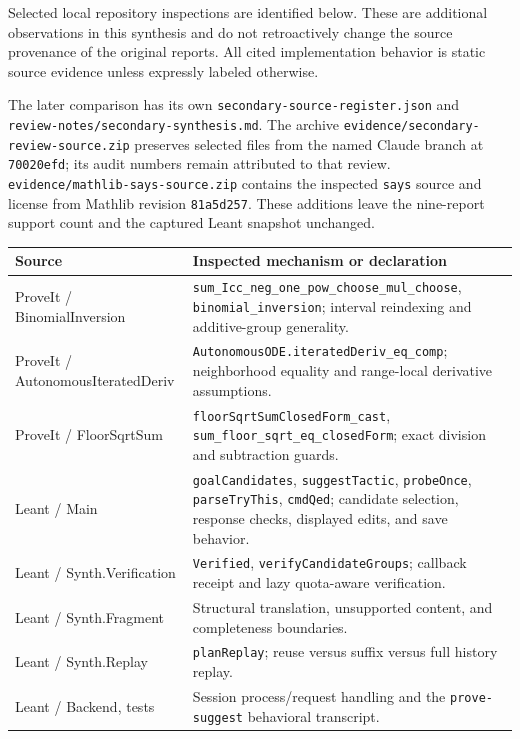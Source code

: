 \documentclass[11pt,letterpaper]{article}
\newcommand{\code}[1]{\nolinkurl{#1}}
\begin{document}
Selected local repository inspections are identified below. These are additional
observations in this synthesis and do not retroactively change the source
provenance of the original reports. All cited implementation behavior is static
source evidence unless expressly labeled otherwise.

The later comparison has its own \code{secondary-source-register.json} and
\code{review-notes/secondary-synthesis.md}. The archive
\code{evidence/secondary-review-source.zip} preserves selected files from the
named Claude branch at \code{70020efd}; its audit numbers remain attributed to
that review. \code{evidence/mathlib-says-source.zip} contains the inspected
\code{says} source and license from Mathlib revision \code{81a5d257}.
These additions leave the nine-report support count and the captured Leant
snapshot unchanged.

\begin{longtable}{@{}P{.31\textwidth}P{.61\textwidth}@{}}
\toprule
Source & Inspected mechanism or declaration \\
\midrule
\endhead
ProveIt / BinomialInversion & \code{sum_Icc_neg_one_pow_choose_mul_choose},
  \code{binomial_inversion}; interval reindexing and additive-group generality.\\
ProveIt / AutonomousIteratedDeriv & \code{AutonomousODE.iteratedDeriv_eq_comp};
  neighborhood equality and range-local derivative assumptions.\\
ProveIt / FloorSqrtSum & \code{floorSqrtSumClosedForm_cast},
  \code{sum_floor_sqrt_eq_closedForm}; exact division and subtraction guards.\\
Leant / Main & \code{goalCandidates}, \code{suggestTactic}, \code{probeOnce},
  \code{parseTryThis}, \code{cmdQed}; candidate selection, response checks,
  displayed edits, and save behavior.\\
Leant / Synth.Verification & \code{Verified}, \code{verifyCandidateGroups}; callback
  receipt and lazy quota-aware verification.\\
Leant / Synth.Fragment & Structural translation, unsupported content, and
  completeness boundaries.\\
Leant / Synth.Replay & \code{planReplay}; reuse versus suffix versus full history replay.\\
Leant / Backend, tests & Session process/request handling and the
  \code{prove-suggest} behavioral transcript.\\
\bottomrule
\end{longtable}
\end{document}

